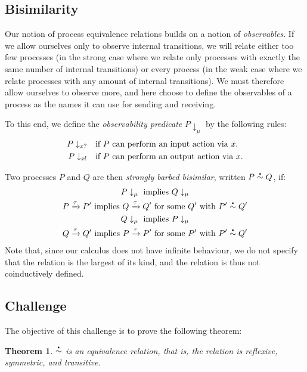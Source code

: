 \documentclass[a4paper]{article}
\newtheorem{theorem}{Theorem}
\newcommand{\Atau}{\tau}
\newcommand{\transition}[3]{#1 \xrightarrow{#2} #3}
\newcommand{\observable}[2]{#1\downarrow_{#2}}
\newcommand{\obsin}[1]{#1?}
\newcommand{\obsout}[1]{#1!}
\newcommand\sbullet[1][.5]{\mathbin{\hbox{\scalebox{#1}{$\bullet$}}}}
\newcommand{\sbbisim}[2]{#1 \overset{\sbullet}{\sim} #2}
\begin{document}
\subsection{Bisimilarity}
Our notion of process equivalence relations builds on a notion of \emph{observables}.
If we allow ourselves only to observe internal transitions, we will relate either too few processes (in the strong case where we relate only processes with exactly the same number of internal transitions) or every process (in the weak case where we relate processes with any amount of internal transitions).
We must therefore allow ourselves to observe more, and here choose to define the observables of a process as the names it can use for sending and receiving.

To this end, we define the \emph{observability predicate} \( \observable{P}{\mu} \) by the following rules:
\begin{align}
  \observable{P}{\obsin{x}}  &\quad \textrm{if \( P \) can perform an input action via \( x \).} \\
  \observable{P}{\obsout{x}} &\quad \textrm{if \( P \) can perform an output action via \( x \).}
\end{align}

Two processes \( P \) and \( Q \) are then \emph{strongly barbed bisimilar}, written \( \sbbisim{P}{Q} \), if:
\begin{gather}
  \observable{P}{\mu}~\textrm{implies}~\observable{Q}{\mu} \\
  \transition{P}{\Atau}{P'}~\textrm{implies}~\transition{Q}{\Atau}{Q'}~\textrm{for some \( Q' \) with}~\sbbisim{P'}{Q'} \\
  \observable{Q}{\mu}~\textrm{implies}~\observable{P}{\mu} \\
  \transition{Q}{\Atau}{Q'}~\textrm{implies}~\transition{P}{\Atau}{P'}~\textrm{for some \( P' \) with}~\sbbisim{P'}{Q'}
\end{gather}
Note that, since our calculus does not have infinite behaviour, we do not specify that the relation is the largest of its kind, and the relation is thus not coinductively defined.

\subsection{Challenge}
The objective of this challenge is to prove the following theorem:
\begin{theorem}
  \( \sbbisim{}{} \) is an equivalence relation, that is, the relation is reflexive, symmetric, and transitive.
\end{theorem}
\end{document}
